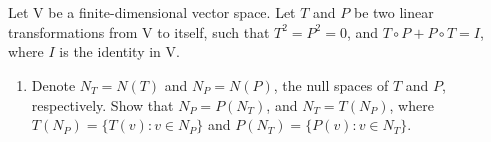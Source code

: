 \documentclass[11pt]{scrartcl}
\begin{document}
\section{}
Let $\mathrm{V}$ be a finite-dimensional vector space. Let $T$ and $P$ be two linear transformations from $\mathrm{V}$ to itself, such that $T^2= P^2 = 0$, and $T \circ P + P \circ T = I$, where $I$ is the identity in $\mathrm{V}$.
\begin{enumerate}[label=\alph*.]
	\item{
		Denote $N_T = N(T)$ and $N_P = N(P)$, the null spaces of $T$ and $P$, respectively. 
		Show that $N_P = P(N_T)$, and $N_T = T(N_P)$, where $T(N_P) = \{ T(v): v \in N_P \}$ and $P(N_T) = \{ P(v): v \in N_T \}$.
	}
\end{enumerate}
\end{document}
